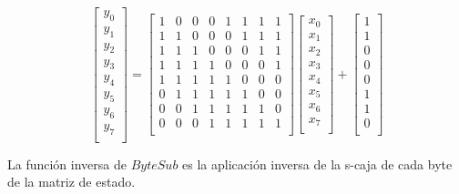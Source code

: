 \begin{enumerate}
				\begin{equation*} 
					\begin{bmatrix} 
						y_0\\
						y_1\\
						y_2\\
						y_3\\
						y_4\\
						y_5\\
						y_6\\
						y_7\\
					\end{bmatrix}
					=
					\begin{bmatrix} %
						1 & 0 & 0 & 0 & 1 & 1 & 1 & 1\\
						1 & 1 & 0 & 0 & 0 & 1 & 1 & 1\\
						1 & 1 & 1 & 0 & 0 & 0 & 1 & 1\\
						1 & 1 & 1 & 1 & 0 & 0 & 0 & 1\\
						1 & 1 & 1 & 1 & 1 & 0 & 0 & 0\\
						0 & 1 & 1 & 1 & 1 & 1 & 0 & 0\\
						0 & 0 & 1 & 1 & 1 & 1 & 1 & 0\\
						0 & 0 & 0 & 1 & 1 & 1 & 1 & 1\\
					\end{bmatrix}
					\begin{bmatrix}
						x_0\\
						x_1\\
						x_2\\
						x_3\\
						x_4\\
						x_5\\
						x_6\\
						x_7\\
					\end{bmatrix}
					+
					\begin{bmatrix}
						1\\
						1\\
						0\\
						0\\
						0\\
						1\\
						1\\
						0\\
					\end{bmatrix}
			\end{equation*}
		\end{enumerate}
		La función inversa de $ByteSub$ es la aplicación inversa de la s-caja de cada byte de la matriz de estado.

